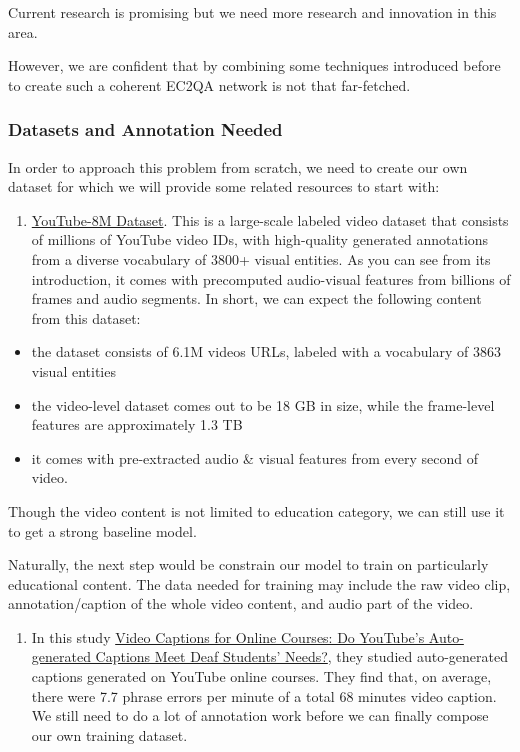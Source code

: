 \documentclass{acm_proc_article-sp}
\providecommand{\tightlist}{%
  \setlength{\itemsep}{0pt}\setlength{\parskip}{0pt}}
\begin{document}
Current research is promising but we need more research and innovation
in this area.

However, we are confident that by combining some techniques introduced
before to create such a coherent EC2QA network is not that far-fetched.

\subsubsection{Datasets and Annotation
Needed}\label{datasets-and-annotation-needed}

In order to approach this problem from scratch, we need to create our
own dataset for which we will provide some related resources to start
with:

\begin{enumerate}
\def\labelenumi{\arabic{enumi}.}
\tightlist
\item
  \href{https://research.google.com/youtube8m/}{YouTube-8M Dataset}.
  This is a large-scale labeled video dataset that consists of millions
  of YouTube video IDs, with high-quality generated annotations from a
  diverse vocabulary of 3800+ visual entities. As you can see from its
  introduction, it comes with precomputed audio-visual features from
  billions of frames and audio segments. In short, we can expect the
  following content from this dataset:
\end{enumerate}

\begin{itemize}
\item
  the dataset consists of 6.1M videos URLs, labeled with a vocabulary of
  3863 visual entities
\item
  the video-level dataset comes out to be 18 GB in size, while the
  frame-level features are approximately 1.3 TB
\item
  it comes with pre-extracted audio \& visual features from every second
  of video.
\end{itemize}

Though the video content is not limited to education category, we can
still use it to get a strong baseline model.

Naturally, the next step would be constrain our model to train on
particularly educational content. The data needed for training may
include the raw video clip, annotation/caption of the whole video
content, and audio part of the video.

\begin{enumerate}
\def\labelenumi{\arabic{enumi}.}
\setcounter{enumi}{1}
\tightlist
\item
  In this study
  \href{http://jofdl.nz/index.php/JOFDL/article/download/255/198}{Video
  Captions for Online Courses: Do YouTube's Auto-generated Captions Meet
  Deaf Students' Needs?}, they studied auto-generated captions generated
  on YouTube online courses. They find that, on average, there were 7.7
  phrase errors per minute of a total 68 minutes video caption. We still
  need to do a lot of annotation work before we can finally compose our
  own training dataset.
\end{enumerate}
\end{document}
